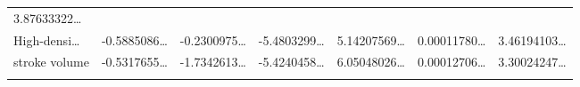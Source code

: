 \documentclass[
]{article}
\begin{document}
\begin{longtable}[]{@{}lllllll@{}}
\begin{minipage}[t]{0.12\columnwidth}
3.87633322\ldots{}\strut
\end{minipage}\tabularnewline
\begin{minipage}[t]{0.12\columnwidth}\raggedright
High-densi\ldots{}\strut
\end{minipage} & \begin{minipage}[t]{0.12\columnwidth}\raggedright
-0.5885086\ldots{}\strut
\end{minipage} & \begin{minipage}[t]{0.12\columnwidth}\raggedright
-0.2300975\ldots{}\strut
\end{minipage} & \begin{minipage}[t]{0.12\columnwidth}\raggedright
-5.4803299\ldots{}\strut
\end{minipage} & \begin{minipage}[t]{0.12\columnwidth}\raggedright
5.14207569\ldots{}\strut
\end{minipage} & \begin{minipage}[t]{0.12\columnwidth}\raggedright
0.00011780\ldots{}\strut
\end{minipage} & \begin{minipage}[t]{0.12\columnwidth}\raggedright
3.46194103\ldots{}\strut
\end{minipage}\tabularnewline
\begin{minipage}[t]{0.12\columnwidth}\raggedright
stroke volume\strut
\end{minipage} & \begin{minipage}[t]{0.12\columnwidth}\raggedright
-0.5317655\ldots{}\strut
\end{minipage} & \begin{minipage}[t]{0.12\columnwidth}\raggedright
-1.7342613\ldots{}\strut
\end{minipage} & \begin{minipage}[t]{0.12\columnwidth}\raggedright
-5.4240458\ldots{}\strut
\end{minipage} & \begin{minipage}[t]{0.12\columnwidth}\raggedright
6.05048026\ldots{}\strut
\end{minipage} & \begin{minipage}[t]{0.12\columnwidth}\raggedright
0.00012706\ldots{}\strut
\end{minipage} & \begin{minipage}[t]{0.12\columnwidth}\raggedright
3.30024247\ldots{}\strut
\end{minipage}\tabularnewline
\begin{minipage}[t]{0.12\columnwidth}\raggedright

\end{minipage}
\end{longtable}
\end{document}
